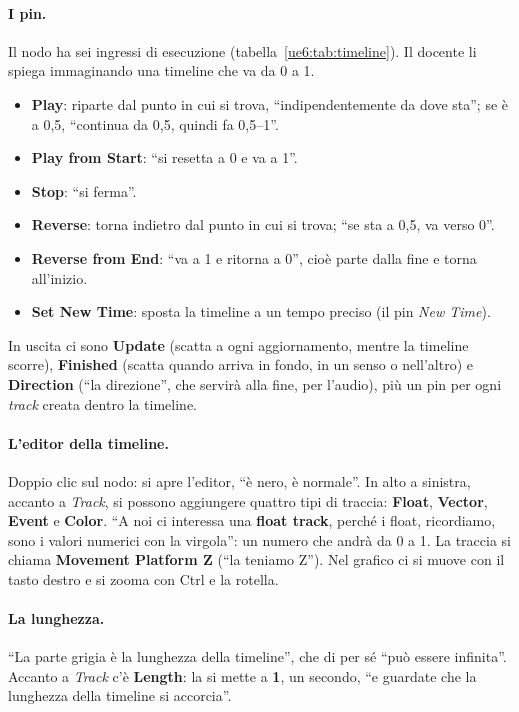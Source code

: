 \paragraph{I pin.} Il nodo ha sei ingressi di esecuzione (tabella~\ref{ue6:tab:timeline}).
Il docente li spiega immaginando una timeline che va da 0 a 1.
\begin{itemize}
  \item \textbf{Play}: riparte dal punto in cui si trova, ``indipendentemente da dove
        sta''; se è a 0,5, ``continua da 0,5, quindi fa 0,5--1''.
  \item \textbf{Play from Start}: ``si resetta a 0 e va a 1''.
  \item \textbf{Stop}: ``si ferma''.
  \item \textbf{Reverse}: torna indietro dal punto in cui si trova; ``se sta a 0,5, va
        verso 0''.
  \item \textbf{Reverse from End}: ``va a 1 e ritorna a 0'', cioè parte dalla fine e
        torna all'inizio.
  \item \textbf{Set New Time}: sposta la timeline a un tempo preciso (il pin
        \emph{New Time}).
\end{itemize}
In uscita ci sono \textbf{Update} (scatta a ogni aggiornamento, mentre la timeline
scorre), \textbf{Finished} (scatta quando arriva in fondo, in un senso o nell'altro) e
\textbf{Direction} (``la direzione'', che servirà alla fine, per l'audio), più un pin
per ogni \emph{track} creata dentro la timeline.

\paragraph{L'editor della timeline.} Doppio clic sul nodo: si apre l'editor, ``è nero,
è normale''. In alto a sinistra, accanto a \emph{Track}, si possono aggiungere quattro
tipi di traccia: \textbf{Float}, \textbf{Vector}, \textbf{Event} e \textbf{Color}. ``A
noi ci interessa una \textbf{float track}, perché i float, ricordiamo, sono i valori
numerici con la virgola'': un numero che andrà da 0 a 1. La traccia si chiama
\textbf{Movement Platform Z} (``la teniamo Z''). Nel grafico ci si muove con il tasto
destro e si zooma con Ctrl e la rotella.

\paragraph{La lunghezza.} ``La parte grigia è la lunghezza della timeline'', che di per
sé ``può essere infinita''. Accanto a \emph{Track} c'è \textbf{Length}: la si mette a
\textbf{1}, un secondo, ``e guardate che la lunghezza della timeline si accorcia''.

